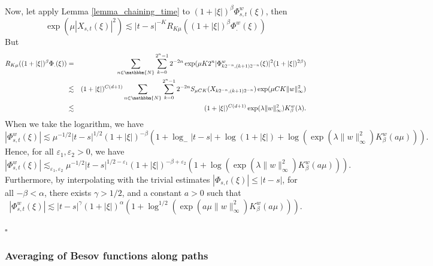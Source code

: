 \documentclass[a4paper,11pt]{article}
\newenvironment{proof}{{\sc Proof.}}{\hfill$\square$}
\begin{document}
\begin{proof}
  
  Now, let apply Lemma \ref{lemma_chaining_time} to $( 1+ | \xi | )^{\beta}
  \Phi^{w}_{s,t} ( \xi )$, then
  \[ \exp ( \mu | X_{s,t} ( \xi ) |^{2} ) \lesssim | t-s |^{-K} R_{K \mu} ( (
     1+ | \xi | )^{\beta} \Phi^{w}_{.} ( \xi ) ) \]
  But
  \begin{eqnarray*}
    R_{K \mu} ( ( 1+ | \xi | )^{\beta} \Phi_{.} ( \xi ) ) & = & \sum_{n \in
    \mathbbm{N}} \sum_{k=0}^{2^{n} -1} 2^{-2n} \exp ( \mu K2^{n} |
    \Phi^{w}_{k2^{-n} , ( k+1 ) 2^{-n}} ( \xi ) |^{2} ( 1+ | \xi | )^{2 \beta}
    )\\
    & \lesssim & ( 1+ | \xi | )^{C ( d+1 )} \sum_{n \in \mathbbm{N}}
    \sum_{k=0}^{2^{n} -1} 2^{-2n} S_{\mu C K} ( X_{k2^{-n} , ( k+1 ) 2^{-n}} )
    \exp ( \mu C K \| w \|_{\infty}^{2} )\\
    & \lesssim & ( 1+ | \xi | )^{C ( d+1 )} \exp ( \lambda \| w
    \|_{\infty}^{2} ) K^{w}_{\beta} ( \lambda ) .
  \end{eqnarray*}
  When we take the logarithm, we have
  \[ | \Phi_{s,t}^{w} ( \xi ) | \lesssim \mu^{-1/2} | t-s |^{1/2} ( 1+ | \xi |
     )^{- \beta} ( 1+ \log_{-} | t-s | + \log ( 1+ | \xi | ) + \log ( \exp (
     \lambda \| w \|_{\infty}^{2} ) K^{w}_{\beta} ( a \mu ) ) ) . \]
  Hence, for all $\varepsilon_{1} , \varepsilon_{2} >0$, we have
  \[ | \Phi_{s,t}^{w} ( \xi ) | \lesssim_{\varepsilon_{1} , \varepsilon_{2}}
     \mu^{-1/2} | t-s |^{1/2- \varepsilon_{1}} ( 1+ | \xi | )^{- \beta +
     \varepsilon_{2}} ( 1+ \log ( \exp ( \lambda \| w \|_{\infty}^{2} )
     K^{w}_{\beta} ( a \mu ) ) ) . \]
  Furthermore, by interpolating with the trivial estimates $| \Phi_{s,t} ( \xi
  ) | \leqslant | t-s |$, for all $- \beta < \alpha$, there exists $\gamma
  >1/2$, and a constant $a>0$ such that
  \[ | \Phi_{s,t}^{w} ( \xi ) | \lesssim | t-s |^{\gamma} ( 1+ | \xi |
     )^{\alpha} ( 1+ \log^{1/2} ( \exp ( a \mu \| w \|_{\infty}^{2} )
     K^{w}_{\beta} ( a \mu ) ) ) . \]
  
\end{proof}

\subsubsection{Averaging of Besov functions along paths}
\end{document}
